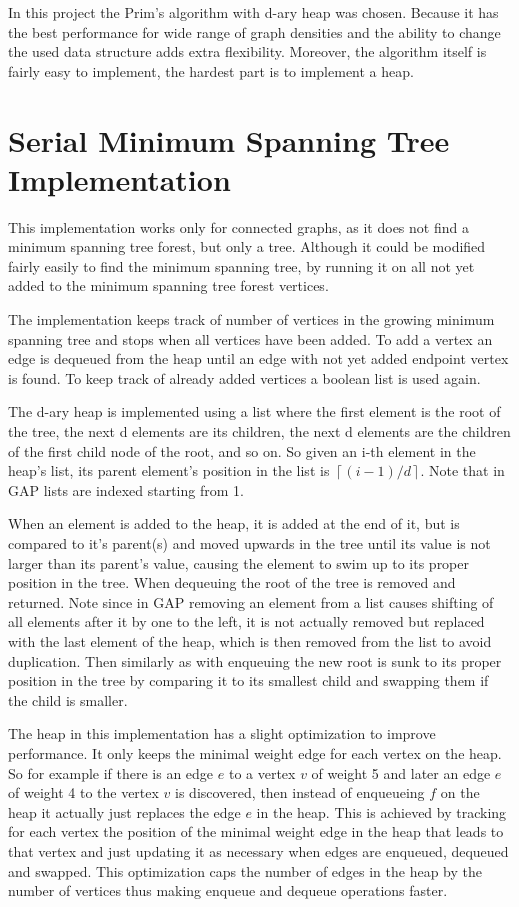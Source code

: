 \documentclass{report}
\theoremstyle{plain}
\theoremstyle{definition}
\theoremstyle{remark}
\begin{document}
In this project the Prim's algorithm with d-ary heap was chosen. Because it has the best performance for wide range of graph densities and 
the ability to change the used data structure adds extra flexibility. Moreover, the algorithm itself is fairly easy to implement, the hardest part is to implement a heap.

\section{Serial Minimum Spanning Tree Implementation}

This implementation works only for connected graphs, as it does not find a minimum spanning tree forest, but only a tree. Although it could be modified fairly easily to find the minimum spanning tree, by running it on all not yet added to the minimum spanning tree forest vertices.

The implementation keeps track of number of vertices in the growing minimum spanning tree and stops when all vertices have been added. To add a vertex an edge is dequeued from the heap until an edge with not yet added endpoint vertex is found. To keep track of already added vertices a boolean list is used again.

The d-ary heap is implemented using a list where the first element is the root of the tree, the next d elements are its children, the next d elements are the children of the first child node of the root, and so on. So given an i-th element in the heap's list, its parent element's position in the list is $\left\lceil(i-1)/d\right\rceil$. Note that in GAP lists are indexed starting from 1. 

When an element is added to the heap, it is added at the end of it, but is compared to it's parent(s) and moved upwards in the tree until its value is not larger than its parent's value, causing the element to swim up to its proper position in the tree. When dequeuing the root of the tree is removed and returned. Note since in GAP removing an element from a list causes shifting of all elements after it by one to the left, it is not actually removed but replaced with the last element of the heap, which is then removed from the list to avoid duplication. Then similarly as with enqueuing the new root is sunk to its proper position in the tree by comparing it to its smallest child and swapping them if the child is smaller.

The heap in this implementation has a slight optimization to improve performance. It only keeps the minimal weight edge for each vertex on the heap. So for example if there is an edge $e$ to a vertex $v$ of weight 5 and later an edge $e$ of weight 4 to the vertex $v$ is discovered, then instead of enqueueing $f$ on the heap it actually just replaces the edge $e$ in the heap. This is achieved by tracking for each vertex the position of the minimal weight edge in the heap that leads to that vertex and just updating it as necessary when edges are enqueued, dequeued and swapped. This optimization caps the number of edges in the heap by the number of vertices thus making enqueue and dequeue operations faster.
\end{document}
